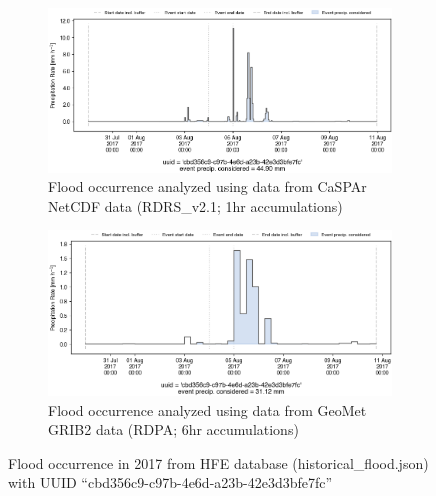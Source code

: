 \documentclass[10pt,a4paper,titlepage,parskip]{scrartcl}
\begin{document}
\begin{figure}[h]
	\begin{subfigure}[a]{1.0\textwidth}
		\centering
		\includegraphics[width=\linewidth]{figures/compare_Geomet_CaSPAr/interpolated_at_stations_occurrence_1534_identified-timesteps_RDRS_v2.1.png}
		\caption{Flood occurrence analyzed using data from CaSPAr NetCDF data (RDRS\_v2.1; 1hr accumulations)}
	\end{subfigure}
	\par\bigskip\bigskip
	\begin{subfigure}[b]{1.0\textwidth}
		\centering
		\includegraphics[width=\linewidth]{figures/compare_Geomet_CaSPAr/interpolated_at_stations_occurrence_1534_identified-timesteps_rdpa_10km_6f.png}
		\caption{Flood occurrence analyzed using data from GeoMet GRIB2 data (RDPA; 6hr accumulations)}
	\end{subfigure}
	\par\bigskip\bigskip
	\caption{Flood occurrence in 2017 from HFE database (historical\_flood.json) with UUID ``cbd356c9-c97b-4e6d-a23b-42e3d3bfe7fc''}
\end{figure}
\pagebreak
\end{document}
